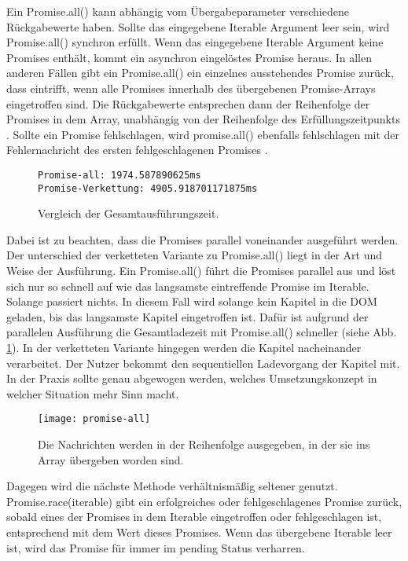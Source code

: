 \noindent
Ein Promise.all() kann abhängig vom Übergabeparameter verschiedene Rückgabewerte haben. Sollte das eingegebene Iterable Argument leer sein, wird Promise.all() synchron erfüllt. Wenn das eingegebene Iterable Argument keine Promises enthält, kommt ein asynchron eingelöstes Promise heraus. In allen anderen Fällen gibt ein Promise.all() ein einzelnes ausstehendes Promise zurück, dass eintrifft, wenn alle Promises innerhalb des übergebenen Promise-Arrays eingetroffen sind. Die Rückgabewerte entsprechen dann der Reihenfolge der Promises in dem Array, unabhängig von der Reihenfolge des Erfüllungszeitpunkts \cite{promise-all}. Sollte ein Promise fehlschlagen, wird promise.all() ebenfalls fehlschlagen mit der Fehlernachricht des ersten fehlgeschlagenen Promises \cite{promise-executor}.\\

\begin{figure}[H]
\begin{lstlisting}
Promise-all: 1974.587890625ms
Promise-Verkettung: 4905.918701171875ms
\end{lstlisting}
\caption{Vergleich der Gesamtausführungszeit.}
\label{comparison-promise-all-and-chained-promise}
\end{figure}

\noindent
Dabei ist zu beachten, dass die Promises parallel voneinander ausgeführt werden. Der unterschied der verketteten Variante zu Promise.all() liegt in der Art und Weise der Ausführung. Ein Promise.all() führt die Promises parallel aus und löst sich nur so schnell auf wie das langsamste eintreffende Promise im Iterable. Solange passiert nichts. In diesem Fall wird solange kein Kapitel in die DOM geladen, bis das langsamste Kapitel eingetroffen ist. Dafür ist aufgrund der parallelen Ausführung die Gesamtladezeit mit Promise.all() schneller (siehe Abb. \ref{comparison-promise-all-and-chained-promise}). In der verketteten Variante hingegen werden die Kapitel nacheinander verarbeitet. Der Nutzer bekommt den sequentiellen Ladevorgang der Kapitel mit. In der Praxis sollte genau abgewogen werden, welches Umsetzungskonzept in welcher Situation mehr Sinn macht.

\begin{figure}[H]
\centering
\texttt{[image: promise-all]}
\caption{Die Nachrichten werden in der Reihenfolge ausgegeben, in der sie ins Array übergeben worden sind.}
\end{figure}

\noindent
Dagegen wird die nächste Methode verhältnismäßig seltener genutzt. Promise.race(iterable) gibt ein erfolgreiches oder fehlgeschlagenes Promise zurück, sobald eines der Promises in dem Iterable eingetroffen oder fehlgeschlagen ist, entsprechend mit dem Wert dieses Promises. Wenn das übergebene Iterable leer ist, wird das Promise für immer im pending Status verharren\cite{promise-race}.

